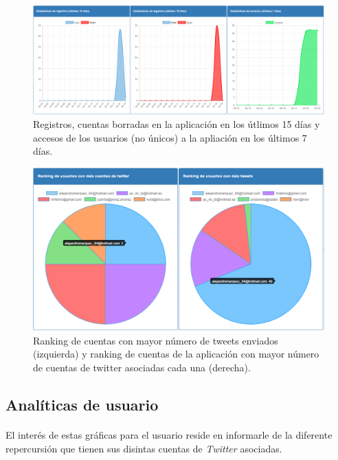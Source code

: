 \documentclass[a4paper]{article}
\begin{document}
			\begin{figure}[H]
				\centering
				\includegraphics[width=1\linewidth]{img/altas-bajas-accesos}
				\caption{Registros, cuentas borradas en la aplicación en los útlimos 15 días y accesos de los usuarios (no únicos) a la apliación en los últimos 7 días.}
				\label{fig:altas-bajas-accesos}
			\end{figure}
			
			\begin{figure}[H]
				\centering
				\includegraphics[width=1\linewidth]{img/rankingsAdmin}
				\caption{Ranking de cuentas con mayor número de tweets enviados (izquierda) y ranking de cuentas de la aplicación con mayor número de cuentas de twitter asociadas cada una (derecha).}
				\label{fig:rankingsAdmin}
			\end{figure}
	
	\subsection{Analíticas de usuario} 

		\paragraph{} El interés de estas gráficas para el usuario reside en informarle de la diferente repercursión que tienen sus disintas cuentas de \textit{Twitter} asociadas. 
		
\end{document}
